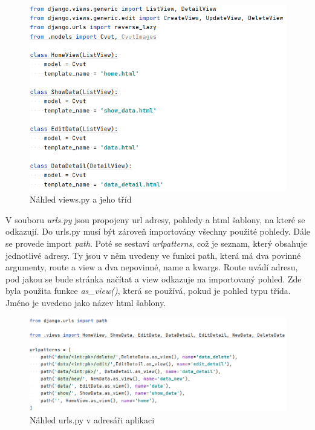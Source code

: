 \begin{figure}[H] \centering
    \includegraphics[width=350pt]{./pictures/6-nahled-views-aplikace.PNG}
    \caption[Náhled views.py a jeho tříd]{Náhled views.py a jeho tříd}
	\label{fig:Náhled views.py a jeho tříd}              
\end{figure}


V souboru \emph{urls.py} jsou propojeny url adresy, pohledy a html šablony, na které se odkazují. Do urls.py musí být zároveň importovány všechny použité pohledy. Dále se provede import \emph{path}. Poté se sestaví \emph{urlpatterns}, což je seznam, který obsahuje jednotlivé adresy. Ty jsou v něm uvedeny ve funkci path, která má dva povinné argumenty, route a view a dva nepovinné, name a kwargs. Route uvádí adresu, pod jakou se bude stránka načítat a view odkazuje na importovaný pohled. Zde byla použita funkce \emph{as\_view()}, která se používá, pokud je pohled typu třída. Jméno je uvedeno jako název html šablony.

\begin{figure}[H] \centering
    \includegraphics[width=450pt]{./pictures/7-urls-aplikace.PNG}
    \caption[Náhled urls.py v adresáři aplikaci]{Náhled urls.py v adresáři aplikaci}
	\label{fig:Náhled urls.py v adresáři aplikaci}              
\end{figure}

